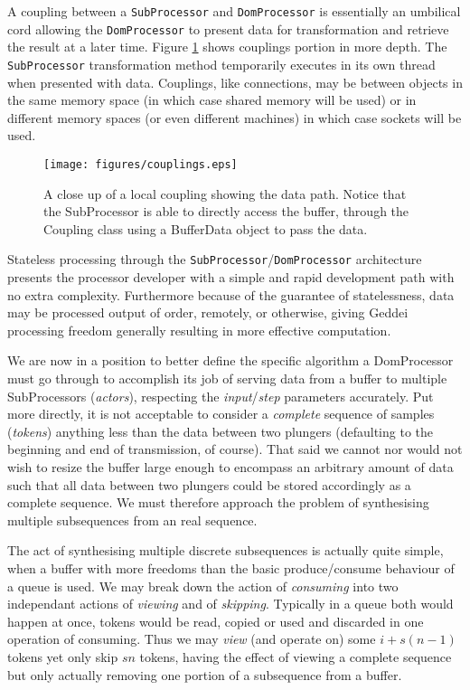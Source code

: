 A coupling between a \texttt{SubProcessor} and \texttt{DomProcessor} is essentially an umbilical cord allowing the \texttt{DomProcessor} to present data for transformation and retrieve the result at a later time. Figure \ref{fig:couplings} shows couplings portion in more depth. The \texttt{SubProcessor} transformation method temporarily executes in its own thread when presented with data. Couplings, like connections, may be between objects in the same memory space (in which case shared memory will be used) or in different memory spaces (or even different machines) in which case sockets will be used.

\begin{figure}[htb!]
\centering
\texttt{[image: figures/couplings.eps]}
\caption{A close up of a local coupling showing the data path. Notice that the SubProcessor is able to directly access the buffer, through the Coupling class using a BufferData object to pass the data.}
\label{fig:couplings}
\end{figure}

Stateless processing through the \texttt{SubProcessor}/\texttt{DomProcessor} architecture presents the processor developer with a simple and rapid development path with no extra complexity. Furthermore because of the guarantee of statelessness, data may be processed output of order, remotely, or otherwise, giving Geddei processing freedom generally resulting in more effective computation.

We are now in a position to better define the specific algorithm a DomProcessor must go through to accomplish its job of serving data from a buffer to multiple SubProcessors (\textit{actors}), respecting the \textit{input}/\textit{step} parameters accurately. Put more directly, it is not acceptable to consider a \textit{complete} sequence of samples (\textit{tokens}) anything less than the data between two plungers (defaulting to the beginning and end of transmission, of course). That said we cannot nor would not wish to resize the buffer large enough to encompass an arbitrary amount of data such that all data between two plungers could be stored accordingly as a complete sequence. We must therefore approach the problem of synthesising multiple subsequences from an real sequence.

The act of synthesising multiple discrete subsequences is actually quite simple, when a buffer with more freedoms than the basic produce/consume behaviour of a queue is used. We may break down the action of \textit{consuming} into two independant actions of \textit{viewing} and of \textit{skipping}. Typically in a queue both would happen at once, tokens would be read, copied or used and discarded in one operation of consuming. Thus we may \textit{view} (and operate on) some $i+s(n-1)$ tokens yet only skip $sn$ tokens, having the effect of viewing a complete sequence but only actually removing one portion of a subsequence from a buffer.

